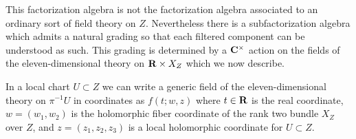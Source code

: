 \documentclass[11pt]{amsart}
\begin{document}
This factorization algebra is not the factorization algebra associated to an ordinary sort of field theory on $Z$.
Nevertheless there is a subfactorization algebra which admits a natural grading so that each filtered component can be understood as such.
This grading is determined by a $\mathbf{C}^\times$ action on the fields of the eleven-dimensional theory on $\mathbf{R} \times X_Z$ which we now describe. 

In a local chart $U \subset Z$ we can write a generic field of the eleven-dimensional theory on $\pi^{-1} U$ in coordinates as $f(t;w,z)$ where $t \in \mathbf{R}$ is the real coordinate, $w=(w_1,w_2)$ is the holomorphic fiber coordinate of the rank two bundle $X_Z$ over $Z$, and $z = (z_1,z_2,z_3)$ is a local holomorphic coordinate for $U \subset Z$. 

%
%
%
%
\end{document}
